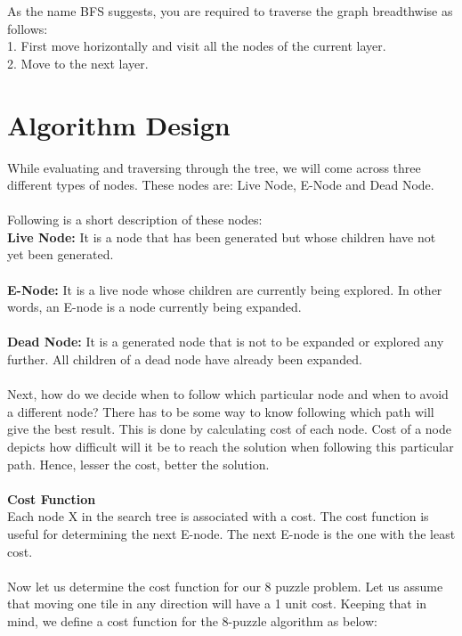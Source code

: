 \documentclass[conference]{IEEEtran}
\begin{document}
As the name BFS suggests, you are required to traverse the graph breadthwise as follows:\\
1. First move horizontally and visit all the nodes of the current layer.\\
2. Move to the next layer.

\section{Algorithm Design}
While evaluating and traversing through the tree, we will come across three different types of nodes. These nodes are: Live Node, E-Node and Dead Node.\\\\
Following is a short description of these nodes:\\
\textbf{Live Node: } It is a node that has been generated but whose children have not yet been generated. \\\\
\textbf{E-Node: } It is a live node whose children are currently being explored. In other words, an E-node is a node currently being expanded.  \\\\
\textbf{Dead Node: } It is a generated node that is not to be expanded or explored any further. All children of a dead node have already been expanded. \\\\
Next, how do we decide when to follow which particular node and when to avoid a different node? There has to be some way to know following which path will give the best result. This is done by calculating cost of each node. Cost of a node depicts how difficult will it be to reach the solution when following this particular path. Hence, lesser the cost, better the solution.\\\\
\textbf{Cost Function }\\Each node X in the search tree is associated with a cost. The cost function is useful for determining the next E-node. The next E-node is the one with the least cost.\\
\\

Now let us determine the cost function for our 8 puzzle problem. Let us assume that moving one tile in any direction will have a 1 unit cost. Keeping that in mind, we define a cost function for the 8-puzzle algorithm as below: \\
\end{document}
